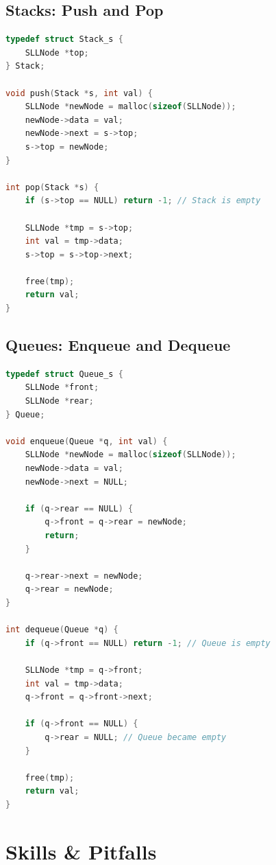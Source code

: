 \subsection{Stacks: Push and Pop}

\begin{lstlisting}[language=C, caption={Stack Implementation (Linked List)}]
typedef struct Stack_s {
    SLLNode *top;
} Stack;

void push(Stack *s, int val) {
    SLLNode *newNode = malloc(sizeof(SLLNode));
    newNode->data = val;
    newNode->next = s->top;
    s->top = newNode;
}

int pop(Stack *s) {
    if (s->top == NULL) return -1; // Stack is empty
    
    SLLNode *tmp = s->top;
    int val = tmp->data;
    s->top = s->top->next;
    
    free(tmp);
    return val;
}
\end{lstlisting}

\subsection{Queues: Enqueue and Dequeue}

\begin{lstlisting}[language=C, caption={Queue Implementation (Linked List)}]
typedef struct Queue_s {
    SLLNode *front;
    SLLNode *rear;
} Queue;

void enqueue(Queue *q, int val) {
    SLLNode *newNode = malloc(sizeof(SLLNode));
    newNode->data = val;
    newNode->next = NULL;
    
    if (q->rear == NULL) {
        q->front = q->rear = newNode;
        return;
    }
    
    q->rear->next = newNode;
    q->rear = newNode;
}

int dequeue(Queue *q) {
    if (q->front == NULL) return -1; // Queue is empty
    
    SLLNode *tmp = q->front;
    int val = tmp->data;
    q->front = q->front->next;
    
    if (q->front == NULL) {
        q->rear = NULL; // Queue became empty
    }
    
    free(tmp);
    return val;
}
\end{lstlisting}

\section{Skills \& Pitfalls}

